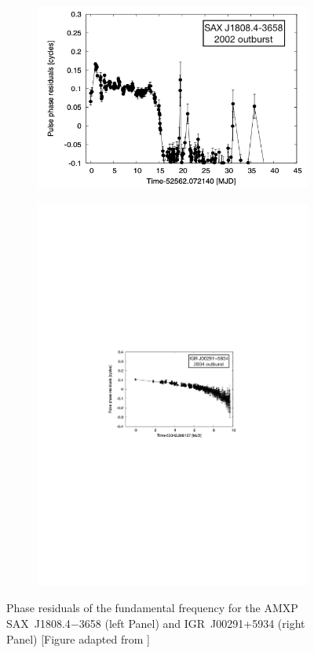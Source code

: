 \documentclass[graybox]{svmult}
\def \saxj{{\rm SAX~J1808.4$-$3658\xspace}}
\begin{document}
\begin{figure}
\begin{subfigure}{.5\textwidth}
  \centering
  \includegraphics[width=1.0\linewidth]{REVIEW_AMXP/1808_phases}
  \label{fig:sfig1}
\end{subfigure}%
\begin{subfigure}{.5\textwidth}
  \centering
  \includegraphics[width=1.05\linewidth]{REVIEW_AMXP/00291_phases_2}
  \label{fig:sfig2}
\end{subfigure}
\caption{Phase residuals of the fundamental frequency for the AMXP \saxj{} (left Panel) and IGR~J00291+5934 (right Panel) [Figure adapted from \cite{Patruno2009d}]}
\label{fig:tim_noise}
\end{figure}
\end{document}
